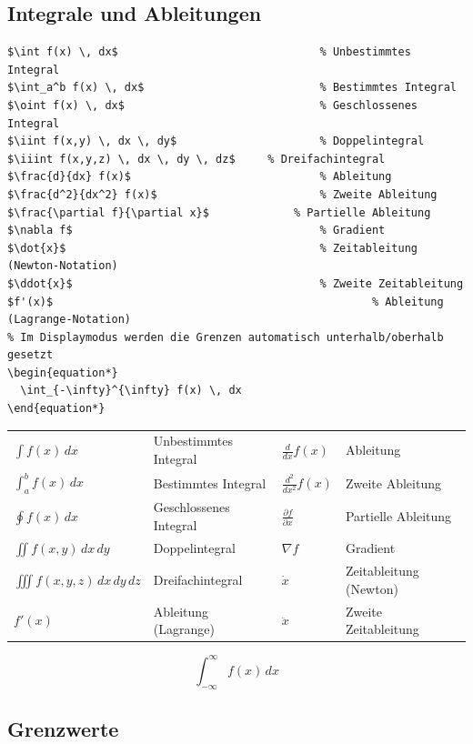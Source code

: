 \documentclass[12pt,a4paper]{article}
\begin{document}
\subsection{Integrale und Ableitungen}

\begin{lstlisting}[style=latex]
$\int f(x) \, dx$          			 			% Unbestimmtes Integral
$\int_a^b f(x) \, dx$       					% Bestimmtes Integral
$\oint f(x) \, dx$          					% Geschlossenes Integral
$\iint f(x,y) \, dx \, dy$  					% Doppelintegral
$\iiint f(x,y,z) \, dx \, dy \, dz$ 	% Dreifachintegral
$\frac{d}{dx} f(x)$         					% Ableitung
$\frac{d^2}{dx^2} f(x)$     					% Zweite Ableitung
$\frac{\partial f}{\partial x}$ 			% Partielle Ableitung
$\nabla f$                  					% Gradient
$\dot{x}$                   					% Zeitableitung (Newton-Notation)
$\ddot{x}$                 						% Zweite Zeitableitung
$f'(x)$             									% Ableitung (Lagrange-Notation)
% Im Displaymodus werden die Grenzen automatisch unterhalb/oberhalb gesetzt
\begin{equation*}
  \int_{-\infty}^{\infty} f(x) \, dx
\end{equation*}        					
\end{lstlisting}

\begin{ausgabe}
\begin{tabular}{l l l l}
	$\int f(x) \, dx$ & Unbestimmtes Integral & $\frac{d}{dx} f(x)$ & Ableitung\\
	$\int_a^b f(x) \, dx$ & Bestimmtes Integral & $\frac{d^2}{dx^2} f(x)$ & Zweite Ableitung\\
	$\oint f(x) \, dx$ & Geschlossenes Integral & $\frac{\partial f}{\partial x}$ & Partielle Ableitung\\
	$\iint f(x,y) \, dx \, dy$ & Doppelintegral & $\nabla f$ & Gradient\\
	$\iiint f(x,y,z) \, dx \, dy \, dz$ & Dreifachintegral & $\dot{x}$ & Zeitableitung (Newton)\\
	$f'(x)$ & Ableitung (Lagrange) & $\ddot{x}$ & Zweite Zeitableitung
\end{tabular}
\begin{equation*}
  \int_{-\infty}^{\infty} f(x) \, dx
\end{equation*} 
\end{ausgabe}



\subsection{Grenzwerte}
\end{document}
